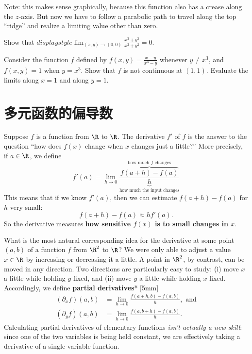 \documentclass[indent]{watsonbook}
\begin{document}
{\begin{solution}
  Note: this makes sense graphically, because this function also has a
  crease along the $z$-axis. But now we have to follow a parabolic
  path to travel along the top ``ridge'' and realize a limiting value
  other than zero.
\end{solution}


\begin{exercise}{}{}
  Show that ${d}isplaystyle{\lim_{(x,y) \to (0,0)} \frac{x^3 + y^3}{x^2 + y^2}} =
  0$.
\end{exercise}

\begin{exercise}{}{}
  Consider the function $f$ defined by $f(x,y) = \frac{x-y}{x^3-y}$
  whenever $y \neq x^3$, and $f(x,y) = 1$ when $y = x^3$. Show that
  $f$ is not continuous at $(1,1)$. Evaluate the limits along
  $x=1$ and along $y=1$.
\end{exercise}

\section{多元函数的偏导数} \label{sec:partial}



Suppose $f$ is a function from $\R$ to $\R$. The derivative $f'$ of
$f$ is the answer to the question ``how does $f(x)$ change when $x$
changes just a little?'' More precisely, if $a\in \R$, we define
\[
  f'(a) = \lim_{h \to 0} \frac{\overbrace{f(a+h)-f(a)}^{\text{how
        much $f$ changes}}}{\underbrace{h}_{\text{how much the input
        changes}}}
\]
This means that if we know $f'(a)$, then we can estimate
$f(a+h) - f(a)$ for $h$ very small:
\[
  f(a+h) - f(a) \approx h
  f'(a).
\]
So the derivative measures \textbf{how sensitive $f(x)$ is to small
  changes in $x$}.

What is the most natural corresponding idea for the derivative at some
point $(a,b)$ of a function $f$ from $\R^2$ to $\R$? We were only able
to adjust a value $x\in \R$ by increasing or decreasing it a little. A
point in $\R^2$, by contrast, can be moved in any direction. Two
directions are particularly easy to study: (i) move $x$ a little while
holding $y$ fixed, and (ii) move $y$ a little while holding $x$
fixed. Accordingly, we define \textbf{partial derivatives}*
[5mm]
\begin{align*}
  (\partial_x f)(a,b) &= \lim_{h \to 0}\frac{f(a+h,b) - f(a,b)}{h},
                        \text{ and} \\
  (\partial_y f)(a,b) &= \lim_{h \to 0}\frac{f(a,b+h) - f(a,b)}{h}.
\end{align*}
Calculating partial derivatives of elementary functions \textit{isn't
  actually a new skill}: since one of the two
variables is being held constant, we are effectively taking a
derivative of a single-variable function.

}
\end{document}
